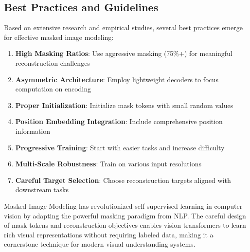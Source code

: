 \subsection{Best Practices and Guidelines}

Based on extensive research and empirical studies, several best practices emerge for effective masked image modeling:

\begin{enumerate}
\item \textbf{High Masking Ratios}: Use aggressive masking (75\%+) for meaningful reconstruction challenges
\item \textbf{Asymmetric Architecture}: Employ lightweight decoders to focus computation on encoding
\item \textbf{Proper Initialization}: Initialize mask tokens with small random values
\item \textbf{Position Embedding Integration}: Include comprehensive position information
\item \textbf{Progressive Training}: Start with easier tasks and increase difficulty
\item \textbf{Multi-Scale Robustness}: Train on various input resolutions
\item \textbf{Careful Target Selection}: Choose reconstruction targets aligned with downstream tasks
\end{enumerate}

Masked Image Modeling has revolutionized self-supervised learning in computer vision by adapting the powerful masking paradigm from NLP. The careful design of mask tokens and reconstruction objectives enables vision transformers to learn rich visual representations without requiring labeled data, making it a cornerstone technique for modern visual understanding systems.